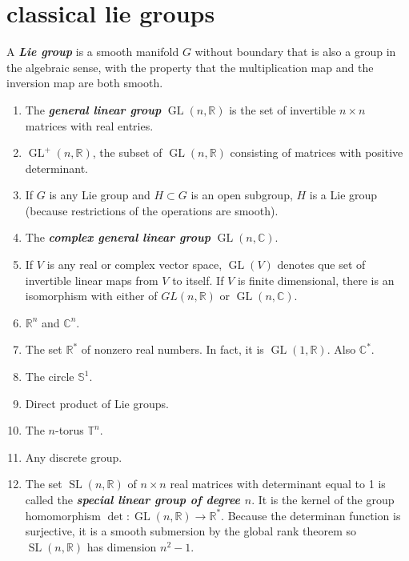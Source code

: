 \section{classical lie groups}
\begin{defn}
	A \textbf{\textit{Lie group}} is a smooth manifold $G$ without boundary that is also a group in the algebraic sense, with the property that the multiplication map and the inversion map are both smooth.
\end{defn}
\begin{example}\leavevmode
	\begin{enumerate}
		\item The \textbf{\textit{general linear group}} $\operatorname{GL}(n,\mathbb{R})$ is the set of invertible $n\times n$ matrices with real entries.
		\item $\operatorname{GL}^+(n,\mathbb{R})$, the subset of $\operatorname{GL}(n,\mathbb{R})$ consisting of matrices with positive determinant.
		\item If $G$ is any Lie group and $H\subset G$ is an open subgroup, $H$ is a Lie group (because restrictions of the operations are smooth).
		\item The \textbf{\textit{complex general linear group}} $\operatorname{GL}(n,\mathbb{C})$.
		\item If $V$ is any real or complex vector space, $\operatorname{GL}(V)$ denotes que set of invertible linear maps from $V$ to itself. If $V$ is finite dimensional, there is an isomorphism with either of $GL(n,\mathbb{R})$ or $\operatorname{GL}(n,\mathbb{C})$.
		\item $\mathbb{R}^n$ and $\mathbb{C}^n$.
		\item The set $\mathbb{R}^*$ of nonzero real numbers. In fact, it is $\operatorname{GL}(1,\mathbb{R})$. Also $\mathbb{C}^*$.
		\item The circle $\mathbb{S}^1$.
		\item Direct product of Lie groups.
		\item The $n$-torus $\mathbb{T}^n$.
		\item Any discrete group.
		\item The set $\operatorname{SL}(n,\mathbb{R})$ of $n\times n$ real matrices with determinant equal to 1 is called the \textbf{\textit{special linear group of degree $n$}}. It is the kernel of the group homomorphism $\det:\operatorname{GL}(n,\mathbb{R})\to\mathbb{R}^*$. Because the determinan function is surjective, it is a smooth submersion by the global rank theorem so $\operatorname{SL}(n,\mathbb{R})$ has dimension $n^2-1$.

\end{enumerate}
\end{example}
